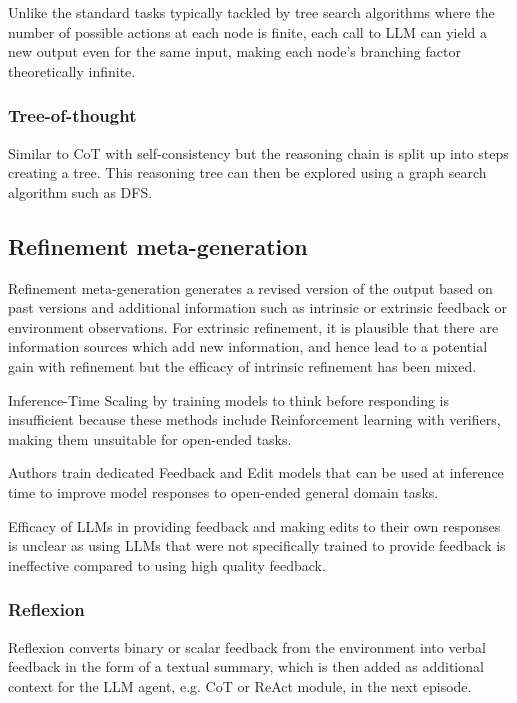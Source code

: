 Unlike the standard tasks typically tackled by tree search algorithms where the number of possible actions at each node is finite, each call to LLM can yield a new output even for the same input, making each node’s branching factor theoretically infinite.\cite{misaki2025widerdeeperscalingllm} 


\subsubsection{Tree-of-thought}
Similar to CoT with self-consistency but the reasoning chain is split up into steps creating a tree. This reasoning tree can then be explored using a graph search algorithm such as DFS.


\subsection{Refinement meta-generation}
Refinement meta-generation generates a revised version of the output based on past versions and additional information such as intrinsic or extrinsic feedback or environment observations. \cite{welleck2024decodingmetagenerationinferencetimealgorithms}
For extrinsic refinement, it is plausible that there are information sources which add new information, and hence lead to a potential gain with refinement but the efficacy of intrinsic refinement has been mixed. \cite{welleck2024decodingmetagenerationinferencetimealgorithms}


Inference-Time Scaling by training models to think before responding is insufficient because these methods include Reinforcement learning with verifiers, making them unsuitable for open-ended tasks. \cite{wang2025dedicatedfeedbackeditmodels}

Authors train dedicated Feedback and Edit models that can be used at inference time to improve model responses to open-ended general domain tasks. \cite{wang2025dedicatedfeedbackeditmodels}

Efficacy of LLMs in providing feedback and making edits to their own responses is unclear as using LLMs that were not specifically trained to provide feedback is ineffective compared to using high quality feedback. \cite{wang2025dedicatedfeedbackeditmodels}


\subsubsection{Reflexion}
Reflexion converts binary or scalar feedback from the environment into verbal feedback in the form 
of a textual summary, which is then added as additional context for the LLM agent, e.g. CoT or ReAct module, in the next episode. \cite{shinn2023reflexionlanguageagentsverbal}

